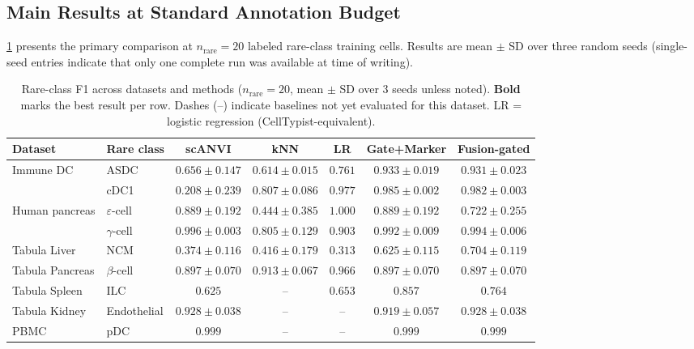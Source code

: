 \subsection{Main Results at Standard Annotation Budget}
\label{sec:main_results}

\cref{tab:main} presents the primary comparison at $n_\text{rare} = 20$ labeled rare-class training cells. Results are mean $\pm$ SD over three random seeds (single-seed entries indicate that only one complete run was available at time of writing).

\begin{table}[t]
\centering
\small
\caption{Rare-class F1 across datasets and methods ($n_\text{rare}=20$, mean $\pm$ SD over 3 seeds unless noted). \textbf{Bold} marks the best result per row. Dashes (--) indicate baselines not yet evaluated for this dataset. LR = logistic regression (CellTypist-equivalent).}
\label{tab:main}
\begin{tabular}{llccccc}
\toprule
Dataset & Rare class & scANVI & kNN & LR & \textbf{Gate+Marker} & Fusion-gated \\
\midrule
Immune DC & ASDC & $0.656{\pm}0.147$ & $0.614{\pm}0.015$ & $0.761$ & \textbf{$0.933{\pm}0.019$} & $0.931{\pm}0.023$ \\
 & cDC1 & $0.208{\pm}0.239$ & $0.807{\pm}0.086$ & $0.977$ & \textbf{$0.985{\pm}0.002$} & $0.982{\pm}0.003$ \\
\midrule
Human pancreas & $\varepsilon$-cell & \textbf{$0.889{\pm}0.192$} & $0.444{\pm}0.385$ & \textbf{$1.000$} & $0.889{\pm}0.192$ & $0.722{\pm}0.255$ \\
 & $\gamma$-cell & \textbf{$0.996{\pm}0.003$} & $0.805{\pm}0.129$ & $0.903$ & $0.992{\pm}0.009$ & $0.994{\pm}0.006$ \\
\midrule
Tabula Liver & NCM & $0.374{\pm}0.116$ & $0.416{\pm}0.179$ & $0.313$ & $0.625{\pm}0.115$ & \textbf{$0.704{\pm}0.119$} \\
Tabula Pancreas & $\beta$-cell & $0.897{\pm}0.070$ & \textbf{$0.913{\pm}0.067$} & $0.966$ & $0.897{\pm}0.070$ & $0.897{\pm}0.070$ \\
Tabula Spleen & ILC & $0.625$ & -- & $0.653$ & \textbf{$0.857$} & $0.764$ \\
Tabula Kidney & Endothelial & \textbf{$0.928{\pm}0.038$} & -- & -- & $0.919{\pm}0.057$ & \textbf{$0.928{\pm}0.038$} \\
PBMC & pDC & \textbf{$0.999$} & -- & -- & \textbf{$0.999$} & \textbf{$0.999$} \\
\bottomrule
\end{tabular}
\end{table}

